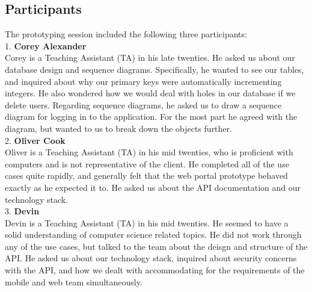 \documentclass[12pt,letterpaper]{article}
\begin{document}
\subsection{Participants}
The prototyping session included the following three participants:\\
1.\hspace*{8pt} \textbf{Corey Alexander}\\
Corey is a Teaching Assistant (TA) in his late twenties. He asked us about our database design and sequence diagrams. Specifically, he wanted to see our tables, and inquired about why our primary keys were automatically incrementing integers. He also wondered how we would deal with holes in our database if we delete users. Regarding sequence diagrams, he asked us to draw a sequence diagram for logging in to the application. For the most part he agreed with the diagram, but wanted to us to break down the objects further.\\[0.5\baselineskip]
2.\hspace*{8pt} \textbf{Oliver Cook}\\
Oliver is a Teaching Assistant (TA) in his mid twenties, who is proficient with computers and is not representative of the client. He completed all of the use cases quite rapidly, and generally felt that the web portal prototype behaved exactly as he expected it to. He asked us about the API documentation and our technology stack.\\[0.5\baselineskip]
3.\hspace*{8pt} \textbf{Devin}\\
Devin is a Teaching Assistant (TA) in his mid twenties. He seemed to have a solid understanding of computer science related topics. He did not work through any of the use cases, but talked to the team about the deisgn and structure of the API. He asked us about our technology stack, inquired about security concerns with the API, and how we dealt with accommodating for the requirements of the mobile and web team simultaneously. \\[0.5\baselineskip]

\clearpage
\end{document}
